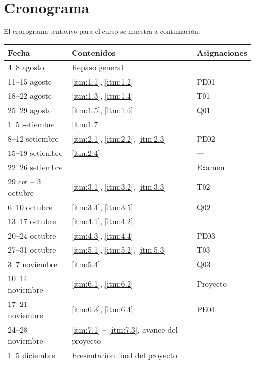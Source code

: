 \section{Cronograma}

El cronograma tentativo para el curso se muestra a continuación:

\begin{longtable}{p{3.5cm}p{5.5cm}p{3cm}}
  \hline
  \hline
  \textbf{Fecha} & \textbf{Contenidos} & \textbf{Asignaciones} \\
  \hline
  4–8 agosto & Repaso general & --- \\
  \hline
  11–15 agosto & \ref{itm:1.1}, \ref{itm:1.2} & PE01 \\
  \hline
  18–22 agosto & \ref{itm:1.3}, \ref{itm:1.4} & T01 \\
  \hline
  25–29 agosto & \ref{itm:1.5}, \ref{itm:1.6} & Q01 \\
  \hline
  1–5 setiembre & \ref{itm:1.7} & --- \\
  \hline
  8–12 setiembre & \ref{itm:2.1}, \ref{itm:2.2}, \ref{itm:2.3} & PE02 \\
  \hline
  15–19 setiembre & \ref{itm:2.4} & --- \\
  \hline
  22–26 setiembre & --- & Examen \\
  \hline
  29 set – 3 octubre & \ref{itm:3.1}, \ref{itm:3.2}, \ref{itm:3.3} & T02 \\
  \hline
  6–10 octubre & \ref{itm:3.4}, \ref{itm:3.5} & Q02 \\
  \hline
  13–17 octubre & \ref{itm:4.1}, \ref{itm:4.2} & --- \\
  \hline
  20–24 octubre & \ref{itm:4.3}, \ref{itm:4.4} & PE03 \\
  \hline
  27–31 octubre & \ref{itm:5.1}, \ref{itm:5.2}, \ref{itm:5.3} & T03 \\
  \hline
  3–7 noviembre & \ref{itm:5.4} & Q03 \\
  \hline
  10–14 noviembre & \ref{itm:6.1}, \ref{itm:6.2} & Proyecto \\
  \hline
  17–21 noviembre & \ref{itm:6.3}, \ref{itm:6.4} & PE04 \\
  \hline
  24–28 noviembre & \ref{itm:7.1} -- \ref{itm:7.3}, avance del proyecto & --- \\
  \hline
  1–5 diciembre & Presentación final del proyecto & --- \\
  \hline
  \hline
\end{longtable}

